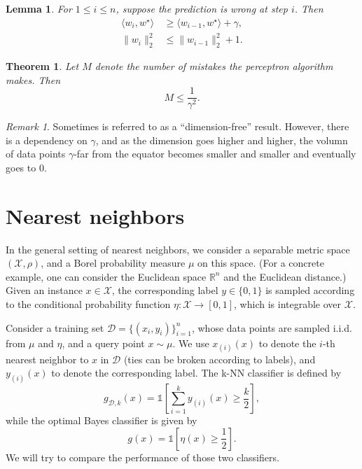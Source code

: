 \documentclass[openany]{book}
\newtheorem{lemma}{Lemma}[chapter]
\newtheorem{theorem}{Theorem}[chapter]
\theoremstyle{definition}
\theoremstyle{remark}
\newtheorem*{remark}{Remark}
\begin{document}
\begin{lemma}
    For $1\le i\le n$, suppose the prediction is wrong at step $i$. Then
    \begin{align*}
        \langle w_i,w^{\star}\rangle & \ge \langle w_{i-1},w^{\star}\rangle+\gamma, \\
        \|w_i\|_2^2 & \le\|w_{i-1}\|_2^2+1.
    \end{align*}
\end{lemma}
\begin{theorem}\label{thm:perceptron}
    Let $M$ denote the number of mistakes the perceptron algorithm makes. Then
    \begin{equation*}
        M\le \frac{1}{\gamma^2}.
    \end{equation*}
\end{theorem}
\begin{remark}
    Sometimes  is referred to as a ``dimension-free'' result. However, there is a dependency on $\gamma$, and as the dimension goes higher and higher, the volumn of data points $\gamma$-far from the equator becomes smaller and smaller and eventually goes to $0$.
\end{remark}

\chapter{Nearest neighbors}
In the general setting of nearest neighbors, we consider a separable metric space $(\mathcal{X},\rho)$, and a Borel probability measure $\mu$ on this space. (For a concrete example, one can consider the Euclidean space $\mathbb{R}^n$ and the Euclidean distance.) Given an instance $x\in \mathcal{X}$, the corresponding label $y\in\{0,1\}$ is sampled according to the conditional probability function $\eta:\mathcal{X}\to[0,1]$, which is integrable over $\mathcal{X}$.

Consider a training set $\mathcal{D}=\{(x_i,y_i)\}_{i=1}^n$, whose data points are sampled i.i.d. from $\mu$ and $\eta$, and a query point $x\sim\mu$. We use $x_{(i)}(x)$ to denote the $i$-th nearest neighbor to $x$ in $\mathcal{D}$ (ties can be broken according to labels), and $y_{(i)}(x)$ to denote the corresponding label. The k-NN classifier is defined by
\begin{equation*}
    g_{\mathcal{D},k}(x)=\mathds{1}\left[\sum_{i=1}^{k}y_{(i)}(x)\ge \frac{k}{2}\right],
\end{equation*}
while the optimal Bayes classifier is given by
\begin{equation*}
    g(x)=\mathds{1}\left[\eta(x)\ge \frac{1}{2}\right].
\end{equation*}
We will try to compare the performance of those two classifiers.
\end{document}
